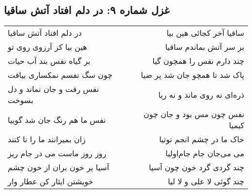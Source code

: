\begin{center}
\section*{غزل شماره ۹: در دلم افتاد آتش ساقیا}
\label{sec:009}
\begin{longtable}{l p{0.5cm} r}
در دلم افتاد آتش ساقیا
&&
ساقیا آخر کجائی هین بیا
\\
هین بیا کز آرزوی روی تو
&&
بر سر آتش بماندم ساقیا
\\
بر گیاه نفس بند آب حیات
&&
چند دارم نفس را همچون گیا
\\
چون سگ نفسم نمکساری بیافت
&&
پاک شد تا همچو جان شد پر ضیا
\\
نفس رفت و جان نماند و دل بسوخت
&&
ذره‌ای نه روی ماند و نه ریا
\\
نفس ما هم رنگ جان شد گوییا
&&
نفس چون مس بود و جان چون کیمیا
\\
زان بمیرانند ما را تا کنند
&&
خاک ما در چشم انجم توتیا
\\
روز روز ماست می در جام ریز
&&
می می‌جان جام جام‌اولیا
\\
آسیا پر خون بران از خون چشم
&&
چند گردی گرد خون چون آسیا
\\
خویشتن ایثار کن عطار وار
&&
چند گوئی لا علی و لا لیا
\\
\end{longtable}
\end{center}
